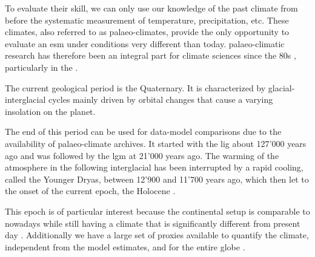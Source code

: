 \begin{refsection}
To evaluate their skill, we can only use our knowledge of the past climate from before the systematic measurement of temperature, precipitation, etc. These climates, also referred to as palaeo-climates, provide the only opportunity to evaluate an \gls{esm} under conditions very different than today. palaeo-climatic research has therefore been an integral part for climate sciences since the 80s \citep{COHMAPMembers1988, JoussaumeTaylor1995}, particularly in the  \citep{BraconnotOttoBliesnerHarrisonEtAl2007, BraconnotOttoBliesnerHarrisonEtAl2007a, BraconnotHarrisonKageyamaEtAl2012, KageyamaBraconnotHarrisonEtAl2016, Otto-BliesnerBraconnotHarrisonEtAl2017, JungclausBardBaroniEtAl2017}. 

The current geological period is the Quaternary. It is characterized by glacial-interglacial cycles mainly driven by orbital changes \citep{HaysImbrieShackleton1976, ImbrieBergerBoyleEtAl1993} that cause a varying insolation on the planet. 

The end of this period can be used for data-model comparisons due to the availability of palaeo-climate archives. It started with the \gls{lig} about 127'000 years ago and was followed by the \gls{lgm} at 21'000 years ago. The warming of the atmosphere in the following interglacial  has been interrupted by a rapid cooling, called the Younger Dryas, between 12'900 and 11'700 years ago, which then let to the onset of the current epoch, the Holocene \citep{WalkerJohnsenRasmussenEtAl2009} .


This epoch is of particular interest because the continental setup is comparable to nowadays while still having a climate that is significantly different from present day . Additionally we have a large set of proxies available to quantify the climate, independent from the model estimates, and for the entire globe \citep{WannerBeerButikoferEtAl2008} . 



\end{refsection}
